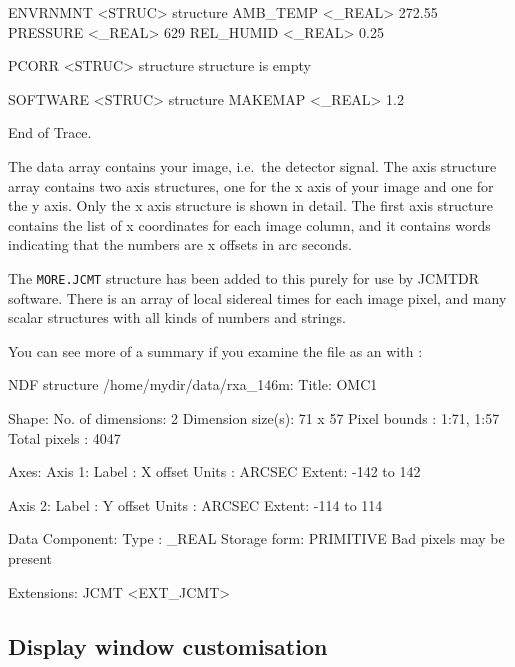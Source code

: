 \documentclass[11pt,noabs]{starlink}
\begin{document}
\begin{terminalv}
        ENVRNMNT       <STRUC>         {structure}
           AMB_TEMP       <_REAL>         272.55
           PRESSURE       <_REAL>         629
           REL_HUMID      <_REAL>         0.25

        PCORR          <STRUC>         {structure}
           {structure is empty}

        SOFTWARE       <STRUC>         {structure}
           MAKEMAP        <_REAL>         1.2

End of Trace.
\end{terminalv}

   The data array contains your image, i.e.\ the detector signal. The axis
   structure array contains two axis structures, one for the x axis of your
   image and one for the y axis. Only the x axis structure is shown in
   detail. The first axis structure contains the list of x coordinates
   for each image column, and it contains words indicating that the
   numbers are x offsets in arc seconds.

   The \texttt{MORE.JCMT} structure has been added to this purely for use
   by JCMTDR software. There is an array of local sidereal times for each
   image pixel, and many scalar structures with all kinds of numbers and
   strings.

   You can see more of a summary if you examine the file as an
   with
\texttt{}:

\begin{terminalv}

NDF structure /home/mydir/data/rxa_146m:
  Title:  OMC1

  Shape:
     No. of dimensions:  2
     Dimension size(s):  71 x 57
     Pixel bounds     :  1:71, 1:57
     Total pixels     :  4047

  Axes:
     Axis 1:
        Label : X offset
        Units : ARCSEC
        Extent: -142 to 142

     Axis 2:
        Label : Y offset
        Units : ARCSEC
        Extent: -114 to 114

  Data Component:
     Type        :  _REAL
     Storage form:  PRIMITIVE
     Bad pixels may be present

  Extensions:
     JCMT             <EXT_JCMT>
\end{terminalv}


\subsection{\label{xmake}Display window customisation}
\end{document}

